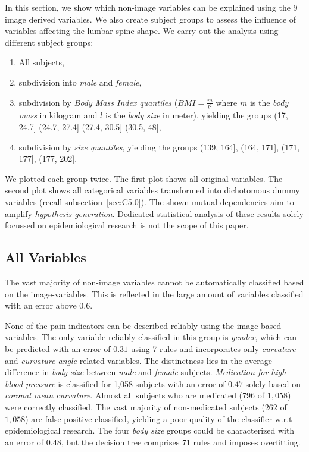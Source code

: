 \documentclass[a4paper,twoside]{style/article}
\begin{document}
\noindent In this section, we show which non-image variables can be explained using the 9 image derived variables.
We also create subject groups to assess the influence of variables affecting the lumbar spine shape.
We carry out the analysis using different subject groups:
\begin{enumerate}
	\item All subjects,
	\item subdivision into \emph{male} and \emph{female},
	\item subdivision by \emph{Body Mass Index quantiles} ($BMI = \frac{m}{l^2}$ where $m$ is the \emph{body mass} in kilogram and $l$ is the \emph{body size} in meter), yielding the groups (17, 24.7] (24.7, 27.4] (27.4, 30.5] (30.5, 48],
	\item subdivision by \emph{size quantiles}, yielding the groups (139, 164], (164, 171], (171, 177], (177, 202].
\end{enumerate}
We plotted each group twice.
The first plot shows all original variables.
The second plot shows all categorical variables transformed into dichotomous dummy variables (recall subsection~\ref{sec:C5.0}).
The shown mutual dependencies aim to amplify \emph{hypothesis generation}.
Dedicated statistical analysis of these results solely focussed on epidemiological research is not the scope of this paper.
\subsection{All Variables}
The vast majority of non-image variables cannot be automatically classified based on the image-variables.
This is reflected in the large amount of variables classified with an error above $0.6$.

None of the pain indicators can be described reliably using the image-based variables.
The only variable reliably classified in this group is \emph{gender}, which can be predicted with an error of $0.31$ using 7 rules and incorporates only \emph{curvature-} and \emph{curvature angle}-related variables.
%
The distinctness lies in the average difference in \emph{body size} between \emph{male} and \emph{female} subjects.
\emph{Medication for high blood pressure} is classified for 1,058 subjects with an error of $0.47$ solely based on \emph{coronal mean curvature}.
Almost all subjects who are medicated ($796$ of $1,058$) were correctly classified.
The vast majority of non-medicated subjects ($262$ of $1,058$) are false-positive classified, yielding a poor quality of the classifier w.r.t epidemiological research.
The four \emph{body size} groups could be characterized with an error of $0.48$, but the decision tree comprises 71 rules and imposes overfitting.
\end{document}
